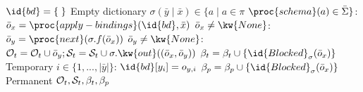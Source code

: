 \documentclass[letterpaper]{article} %
\theoremstyle{plain}\newtheorem{thm}{Theorem}
\theoremstyle{definition}\newtheorem{defn}{Definition}
\theoremstyle{plain}\newtheorem{lem}{Lemma}
\theoremstyle{plain}\newtheorem{cor}{Corollary}
\begin{document}
\begin{footnotesize}
\begin{codebox}
\zi $\id{bd} = \{\;\}$ \Comment Empty dictionary
\zi \For $\sigma (\bar{y} \mid \bar{x}) \in \{a \mid a \in \pi$
 $\proc{schema}(a) \in \bar{\Sigma}\}$: \Do
\zi $\bar{o}_x = \proc{apply-bindings}(\id{bd}, \bar{x})$
\zi \If $\bar{o}_x  \neq \kw{None}$: \Then 
\zi $\bar{o}_y = \proc{next}(\sigma.f(\bar{o}_x))$  
\zi \If $\bar{o}_y  \neq \kw{None}$: \Then 
\zi ${\cal O}_t = {\cal O}_t \cup \bar{o}_y; {\cal S}_t ={\cal S}_t \cup \sigma.\kw{out}((\bar{o}_x, \bar{o}_y))$ 
\zi $\beta_t = \beta_t \cup \{\id{Blocked}_\sigma(\bar{o}_x)\}$ \Comment Temporary
\zi \For $i \in \{1, ..., |\bar{y}|\}$: \Then
\zi $\id{bd}[y_i] = o_{y, i}$
\End
\zi \Else
\zi $\beta_p = \beta_p \cup \{\id{Blocked}_\sigma(\bar{o}_x)\}$ \Comment Permanent
\End\End\End
\zi \Return ${\cal O}_t, {\cal S}_t, \beta_t, \beta_p$
\end{codebox}
\end{footnotesize}

\end{document}
